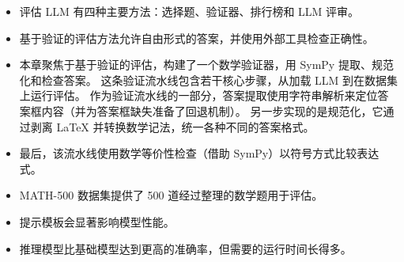 \begin{itemize}
\item 评估 LLM 有四种主要方法：选择题、验证器、排行榜和 LLM 评审。
\item 基于验证的评估方法允许自由形式的答案，并使用外部工具检查正确性。
\item 本章聚焦于基于验证的评估，构建了一个数学验证器，用 SymPy 提取、规范化和检查答案。 这条验证流水线包含若干核心步骤，从加载 LLM 到在数据集上运行评估。 作为验证流水线的一部分，答案提取使用字符串解析来定位答案框内容（并为答案框缺失准备了回退机制）。 另一步实现的是规范化，它通过剥离 LaTeX 并转换数学记法，统一各种不同的答案格式。
\item 最后，该流水线使用数学等价性检查（借助 SymPy）以符号方式比较表达式。
\item MATH-500 数据集提供了 500 道经过整理的数学题用于评估。
\item 提示模板会显著影响模型性能。
\item 推理模型比基础模型达到更高的准确率，但需要的运行时间长得多。
\end{itemize}
